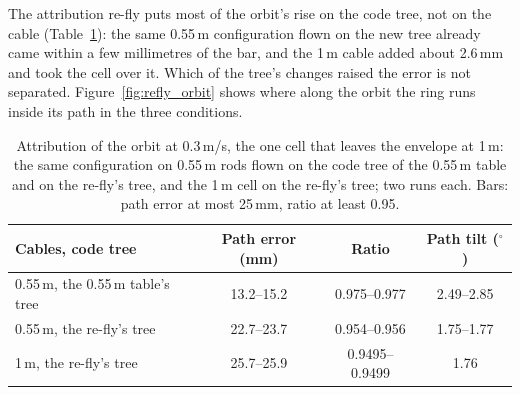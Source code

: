 
The attribution re-fly puts most of the orbit's rise on the code tree, not on the cable
(Table~\ref{tab:refly_attrib}): the same 0.55\,m configuration flown on the new tree already came within a few
millimetres of the bar, and the 1\,m cable added about 2.6\,mm and took the cell over it. Which of the tree's changes
raised the error is not separated. Figure~\ref{fig:refly_orbit} shows where along the orbit the ring runs inside its
path in the three conditions.

\begin{table}[htbp]
\centering
\footnotesize
\caption[Attribution of the orbit's rise]{Attribution of the orbit at 0.3\,m/s, the one cell that leaves the
envelope at 1\,m: the same configuration on 0.55\,m rods flown on the code tree of the 0.55\,m table and on the
re-fly's tree, and the 1\,m cell on the re-fly's tree; two runs each. Bars: path error at most 25\,mm, ratio at least
0.95.}
\label{tab:refly_attrib}
\begin{tabular}{lccc}
\toprule
Cables, code tree & Path error (mm) & Ratio & Path tilt ($^\circ$) \\
\midrule
0.55\,m, the 0.55\,m table's tree & 13.2--15.2 & 0.975--0.977 & 2.49--2.85 \\
0.55\,m, the re-fly's tree & 22.7--23.7 & 0.954--0.956 & 1.75--1.77 \\
1\,m, the re-fly's tree & 25.7--25.9 & 0.9495--0.9499 & 1.76 \\
\bottomrule
\end{tabular}
\end{table}


